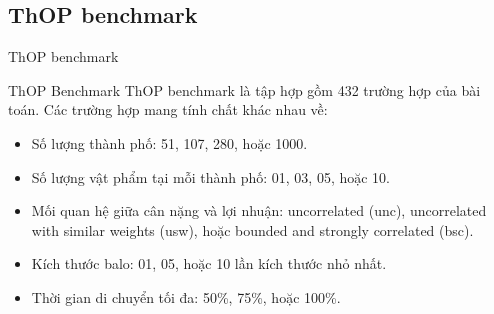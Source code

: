 \documentclass[aspectratio=169]{beamer}
\begin{document}


\subsection{ThOP benchmark}
\begin{frame}{ThOP benchmark}
    \begin{block}{ThOP Benchmark}
        \justifying
        ThOP benchmark là tập hợp gồm 432 trường hợp của bài toán. Các trường hợp mang tính chất khác nhau về:
        \begin{itemize}
            \item Số lượng thành phố: 51, 107, 280, hoặc 1000.
            \item Số lượng vật phẩm tại mỗi thành phố: 01, 03, 05, hoặc 10.
            \item Mối quan hệ giữa cân nặng và lợi nhuận: uncorrelated (unc), uncorrelated with similar weights (usw), hoặc bounded and strongly correlated (bsc).
            \item Kích thước balo: 01, 05, hoặc 10 lần kích thước nhỏ nhất.
            \item Thời gian di chuyển tối đa: 50\%, 75\%, hoặc 100\%.
        \end{itemize}
    \end{block}
\end{frame}
\end{document}
